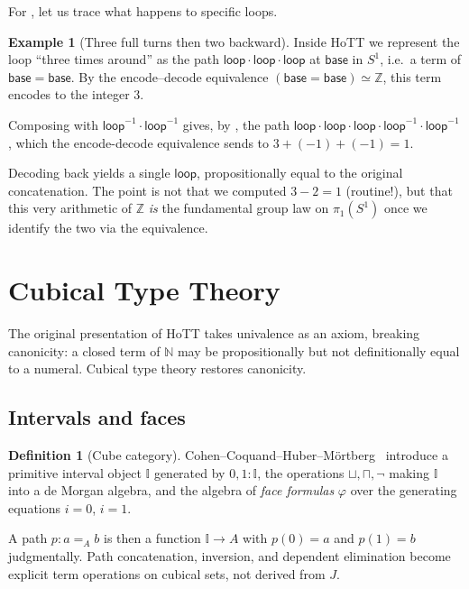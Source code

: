 \documentclass[12pt]{article}
\theoremstyle{definition}
\newtheorem{definition}[theorem]{Definition}
\newtheorem{example}[theorem]{Example}
\theoremstyle{remark}
\newcommand{\N}{\mathbb{N}}
\newcommand{\Z}{\mathbb{Z}}
\newcommand{\eqv}{\simeq}
\newcommand{\looppath}{\mathsf{loop}}
\newcommand{\base}{\mathsf{base}}
\newcommand{\Sone}{S^1}
\begin{document}
For , let us trace what happens to specific loops.

\begin{example}[Three full turns then two backward]
\label{ex:loops}
Inside HoTT we represent the loop ``three times around'' as the path
$\looppath \cdot \looppath \cdot \looppath$ at $\base$ in $\Sone$, i.e.\ a term
of $\base = \base$. By the encode--decode equivalence
$(\base = \base) \eqv \Z$, this term encodes to the integer $3$.

Composing with $\looppath^{-1} \cdot \looppath^{-1}$ gives, by
, the path
$\looppath \cdot \looppath \cdot \looppath \cdot \looppath^{-1} \cdot \looppath^{-1}$,
which the encode-decode equivalence sends to $3 + (-1) + (-1) = 1$.

Decoding back yields a single $\looppath$, propositionally equal to the
original concatenation. The point is not that we computed $3 - 2 = 1$
(routine!), but that this very arithmetic of $\Z$ \emph{is} the
fundamental group law on $\pi_1(\Sone)$ once we identify the two via
the equivalence.
\end{example}

\section{Cubical Type Theory}
\label{sec:cubical}

The original presentation of HoTT takes univalence as an axiom, breaking
canonicity: a closed term of $\N$ may be propositionally but not
definitionally equal to a numeral. Cubical type theory restores
canonicity.

\subsection{Intervals and faces}

\begin{definition}[Cube category]
\label{def:cube}
Cohen--Coquand--Huber--M\"ortberg~\cite{CCHM} introduce a primitive
interval object $\mathbb{I}$ generated by $0, 1 : \mathbb{I}$, the
operations $\sqcup, \sqcap, \neg$ making $\mathbb{I}$ into a de Morgan
algebra, and the algebra of \emph{face formulas} $\varphi$ over the
generating equations $i = 0$, $i = 1$.
\end{definition}

A path $p : a =_A b$ is then a function $\mathbb{I} \to A$ with $p(0) = a$
and $p(1) = b$ judgmentally. Path concatenation, inversion, and dependent
elimination become explicit term operations on cubical sets, not derived
from $J$.
\end{document}
